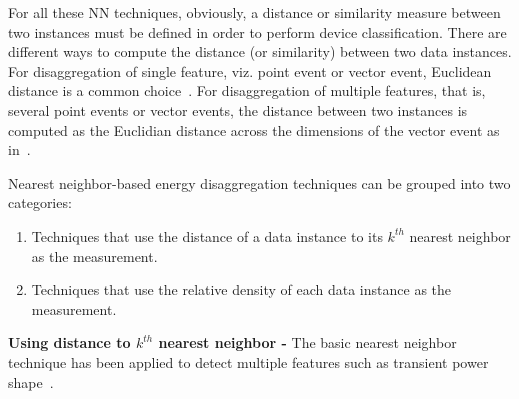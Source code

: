 For all these NN techniques, obviously, a distance or similarity measure between two instances 
must be defined in order to perform device classification. 
There are different ways to compute the distance (or similarity) between two data instances.
For disaggregation of single feature, viz. point event or vector event, 
Euclidean distance is a common choice~\cite{gupta2010electrisense}.
For disaggregation of multiple features, that is, several point events or vector events, 
the distance between two instances is computed as the Euclidian distance across the dimensions of the vector event as in~\cite{shaw2000PhdThesis}. 

Nearest neighbor-based energy disaggregation techniques can be grouped into 
two categories: 
\begin{enumerate}
\item Techniques that use the distance of a data instance to its $k^{th}$ nearest neighbor 
as the measurement. 
\item Techniques that use the relative density of each data instance as the measurement. 
\end{enumerate}

\textbf{Using distance to $k^{th}$ nearest neighbor - }
The basic nearest neighbor technique has been applied to detect 
multiple features such as transient power shape~\cite{shaw2000PhdThesis,lee2005estimation,berges2009learning,berges2010enhancing}.




